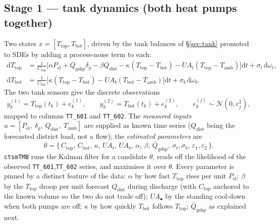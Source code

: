 \documentclass[11pt,a4paper]{article}
\newcommand{\Ttop}{T_{\mathrm{top}}}
\newcommand{\Tbot}{T_{\mathrm{bot}}}
\newcommand{\Tamb}{T_{\mathrm{amb}}}
\newcommand{\Pel}{P_{\mathrm{el}}}
\newcommand{\code}[1]{\texttt{#1}}
\begin{document}
\subsection{Stage 1 --- tank dynamics (both heat pumps together)}
Two states $x=[\Ttop,\Tbot]$, driven by the tank balances of \S\ref{sec:tank}
promoted to SDEs by adding a process-noise term to each:
\begin{align}
  \mathrm d\Ttop &= \tfrac{1}{C_{\mathrm{top}}}\!\Big[
      \alpha\Pel + \bar Q_{\mathrm{gshp}}\delta_g
      - \beta Q_{\mathrm{dist}} - \kappa(\Ttop-\Tbot) - UA_t(\Ttop-\Tamb)\Big]\mathrm dt
      + \sigma_t\,\mathrm d\omega_t, \label{eq:sde-top}\\
  \mathrm d\Tbot &= \tfrac{1}{C_{\mathrm{bot}}}\!\Big[
      \kappa(\Ttop-\Tbot) - UA_b(\Tbot-\Tamb)\Big]\mathrm dt
      + \sigma_b\,\mathrm d\omega_b. \label{eq:sde-bot}
\end{align}
The two tank sensors give the discrete observations
\begin{equation}
  y^{(1)}_k = \Ttop(t_k) + e^{(1)}_k, \qquad
  y^{(2)}_k = \Tbot(t_k) + e^{(2)}_k, \qquad
  e^{(j)}_k\sim\mathcal N(0,\varepsilon_j^2),
  \label{eq:tank-obs}
\end{equation}
mapped to columns \code{TT\_601} and \code{TT\_602}. The \emph{measured inputs}
$u=[\Pel,\ \delta_g,\ Q_{\mathrm{dist}},\ \Tamb]$ are supplied as known time series
($Q_{\mathrm{dist}}$ being the forecasted district load, not a flow); the
\emph{estimated parameters} are
\[
  \theta=\{\,C_{\mathrm{top}},\,C_{\mathrm{bot}},\,\kappa,\,UA_t,\,UA_b,\,
  \alpha,\,\beta,\,\bar Q_{\mathrm{gshp}},\,\sigma_t,\sigma_b,\,\varepsilon_1,\varepsilon_2\,\}.
\]
\texttt{ctsmTMB} runs the Kalman filter for a candidate $\theta$, reads off the
likelihood of the observed \code{TT\_601},\code{TT\_602} series, and maximises it
over $\theta$. Every parameter is pinned by a distinct feature of the data:
$\alpha$ by how fast $\Ttop$ rises per unit $\Pel$; $\beta$ by the $\Ttop$ droop per
unit forecast $Q_{\mathrm{dist}}$ during discharge (with $C_{\mathrm{top}}$ anchored
to the known volume so the two do not trade off); $UA_\bullet$ by the standing
cool-down when both pumps are off; $\kappa$ by how quickly $\Tbot$ follows $\Ttop$;
$\bar Q_{\mathrm{gshp}}$ as explained next.
\end{document}
